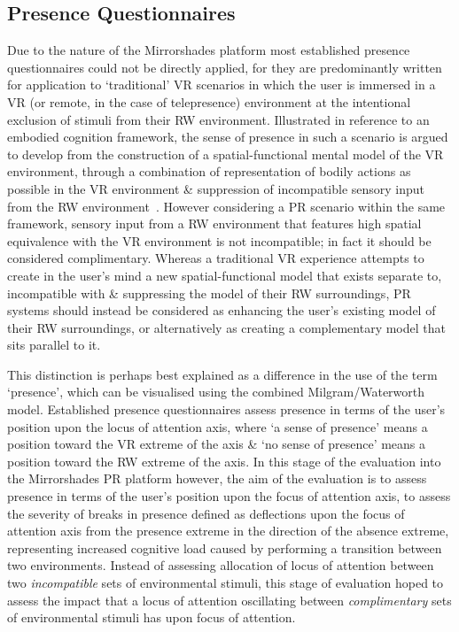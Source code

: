 
\subsection{Presence Questionnaires}

Due to the nature of the Mirrorshades platform most established presence questionnaires could not be directly applied,  for they are predominantly written for application to `traditional' VR scenarios in which the user is immersed in a VR (or remote, in the case of telepresence) environment at the intentional exclusion of stimuli from their RW environment. Illustrated in reference to an embodied cognition framework, the sense of presence in such a scenario is argued to develop from the construction of a spatial-functional mental model of the VR environment, through a combination of representation of bodily actions as possible in the VR environment \& suppression of incompatible sensory input from the RW environment~\cite{Schubert2001}. However considering a PR scenario within the same framework, sensory input from a RW environment that features high spatial equivalence with the VR environment is not incompatible; in fact it should be considered complimentary. Whereas a traditional VR experience attempts to create in the user's mind a new spatial-functional model that exists separate to, incompatible with \& suppressing the model of their RW surroundings, PR systems should instead be considered as enhancing the user's existing model of their RW surroundings, or alternatively as creating a complementary model that sits parallel to it.

This distinction is perhaps best explained as a difference in the use of the term `presence', which can be visualised using the combined Milgram/Waterworth model. Established presence questionnaires assess presence in terms of the user's position upon the locus of attention axis, where `a sense of presence' means a position toward the VR extreme of the axis \& `no sense of presence' means a position toward the RW extreme of the axis. In this stage of the evaluation into the Mirrorshades PR platform however, the aim of the evaluation is to assess presence in terms of the user's position upon the focus of attention axis, to assess the severity of breaks in presence defined as deflections upon the focus of attention axis from the presence extreme in the direction of the absence extreme, representing increased cognitive load caused by performing a transition between two environments. Instead of assessing allocation of locus of attention between two \textit{incompatible} sets of environmental stimuli, this stage of evaluation hoped to assess the impact that a locus of attention oscillating between \textit{complimentary} sets of environmental stimuli has upon focus of attention.


